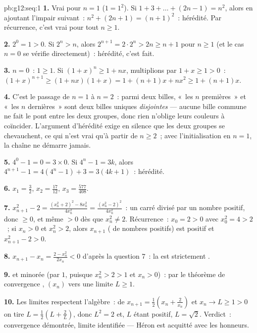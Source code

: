 \begin{solution}{pb:g12:seq:1}
\textbf{1.} Vrai pour $n = 1$ ($1 = 1^2$). Si
$1 + 3 + \dots + (2n - 1) = n^2$, alors en ajoutant l'impair
suivant~: $n^2 + (2n + 1) = (n + 1)^2$~: hérédité. Par récurrence,
c'est vrai pour tout $n \geq 1$.

\textbf{2.} $2^0 = 1 > 0$. Si $2^n > n$, alors
$2^{n+1} = 2 \cdot 2^n > 2n \geq n + 1$ pour $n \geq 1$ (et le cas
$n = 0$ se vérifie directement)~: hérédité, c'est fait.

\textbf{3.} $n = 0$~: $1 \geq 1$. Si $(1 + x)^n \geq 1 + nx$,
multiplions par $1 + x \geq 1 > 0$~:
$(1 + x)^{n+1} \geq (1 + nx)(1 + x) = 1 + (n + 1)x + nx^2
\geq 1 + (n + 1)x$.

\textbf{4.} C'est le passage de $n = 1$ à $n = 2$~: parmi deux
billes, «~les $n$ premières~» et «~les $n$ dernières~» sont deux
billes uniques \emph{disjointes} --- aucune bille commune ne fait le
pont entre les deux groupes, donc rien n'oblige leurs couleurs à
coïncider. L'argument d'hérédité exige en silence que les deux
groupes se chevauchent, ce qui n'est vrai qu'à partir de
$n \geq 2$~; avec l'initialisation en $n = 1$, la chaîne ne démarre
jamais.

\textbf{5.} $4^0 - 1 = 0 = 3 \times 0$. Si $4^n - 1 = 3k$, alors
$4^{n+1} - 1 = 4(4^n - 1) + 3 = 3(4k + 1)$~: hérédité.

\textbf{6.} $x_1 = \frac32$, $x_2 = \frac{17}{12}$,
$x_3 = \frac{577}{408}$.

\textbf{7.} $x_{n+1}^2 - 2 = \frac{(x_n^2 + 2)^2 - 8x_n^2}
{4x_n^2} = \frac{(x_n^2 - 2)^2}{4 x_n^2}$~: un carré divisé par un
nombre positif, donc $\geq 0$, et même $> 0$ dès que
$x_n^2 \neq 2$. Récurrence~: $x_0 = 2 > 0$ avec $x_0^2 = 4 > 2$~;
si $x_n > 0$ et $x_n^2 > 2$, alors $x_{n+1}$ ( de nombres
positifs) est positif et $x_{n+1}^2 - 2 > 0$.

\textbf{8.} $x_{n+1} - x_n = \frac{2 - x_n^2}{2x_n} < 0$ d'après la
question 7~: la  est strictement .

\textbf{9.}  et minorée (par $1$, puisque $x_n^2 > 2 >
1$ et $x_n > 0$)~: par le théorème de convergence ,
$(x_n)$  vers une limite $L \geq 1$.

\textbf{10.} Les limites respectent l'algèbre~: de
$x_{n+1} = \frac12\left(x_n + \frac{2}{x_n}\right)$ et
$x_n \to L \geq 1 > 0$ on tire
$L = \frac12\left(L + \frac2L\right)$, donc $L^2 = 2$ et, $L$ étant
positif, $L = \sqrt2$. Verdict~: convergence démontrée, limite
identifiée --- Héron est acquitté avec les honneurs.


\end{solution}
